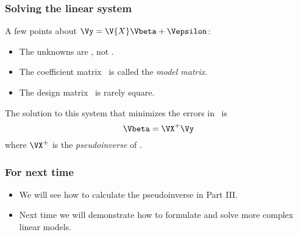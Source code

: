 \documentclass{beamer}
\begin{document}
\begin{frame}
\frametitle{Solving the linear system}

A few points about $\Vy = \V{X}\Vbeta+\Vepsilon$:
\begin{itemize}
	\item The unknowns are \Vbeta, not .
	\item The coefficient matrix \ is called the \emph{model matrix}.
	\item The design matrix \ is rarely square.
\end{itemize}

\pause
The solution to this system that minimizes the errors in \Vepsilon\ is 
\[ \Vbeta = \VX^+\Vy \]
where $\VX^+$ is the \emph{pseudoinverse} of \VX.
\end{frame}

\begin{frame}
\frametitle{For next time}
\begin{itemize}
	\item We will see how to calculate the pseudoinverse in Part III.
	\item Next time we will demonstrate how to formulate and solve more complex linear models.
\end{itemize}	
\end{frame}
\end{document}
